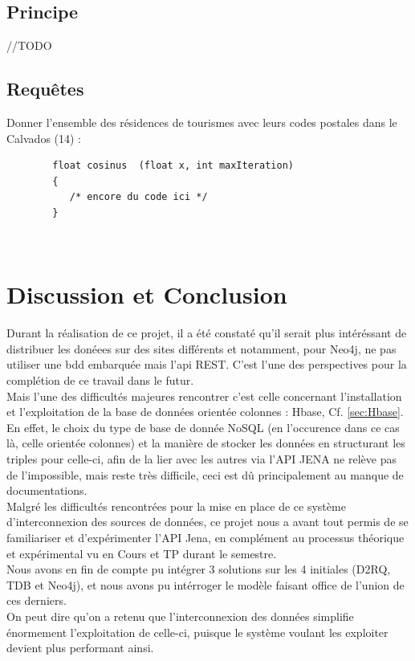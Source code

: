 \documentclass{article}
\newenvironment{DDbox}[1]{
\begin{lrbox}{\BBbox}\begin{minipage}{\linewidth}}
{\end{minipage}\end{lrbox}\noindent\colorbox{Zgris}{\usebox{\BBbox}} \\
[.5cm]}
\begin{document}
\subsection{Principe}
//TODO

\subsection{Requêtes}

Donner l'ensemble des résidences de tourismes avec leurs codes postales dans le Calvados (14) : \\

\begin{DDbox}{\linewidth}
\begin{Verbatim}
        float cosinus  (float x, int maxIteration)
        {
           /* encore du code ici */
        }
\end{Verbatim}
\end{DDbox}


\section{Discussion et Conclusion }
Durant la réalisation de ce projet, il a été constaté qu'il serait plus intéréssant de distribuer les donéees sur des sites différents et notamment, pour Neo4j, ne pas utiliser une bdd embarquée mais l'api REST. C'est l'une des perspectives pour la complétion de ce travail dans le futur.\\

Mais l'une des difficultés majeures rencontrer c'est celle concernant l'installation et l'exploitation de la base de données orientée colonnes : Hbase, Cf. \ref{sec:Hbase}.\\
En effet, le choix du type de base de donnée NoSQL (en l'occurence dans ce cas là, celle orientée colonnes) et la manière de stocker les données en structurant les triples pour celle-ci,  afin de la lier avec les autres via l'API JENA ne relève pas de l'impossible, mais reste très difficile, ceci est dû principalement au manque de documentations.\\
Malgré les difficultés rencontrées pour la mise en place de ce système d'interconnexion des sources de données, ce projet nous a avant tout permis de se familiariser et d'expérimenter l'API Jena, en complément au processus théorique et expérimental vu en Cours et TP durant le semestre.\\
Nous avons en fin de compte pu intégrer 3 solutions sur les 4 initiales (D2RQ, TDB et Neo4j), et nous avons pu intérroger le modèle faisant office de l'union de ces derniers.\\
On peut dire qu'on a retenu que l'interconnexion des données simplifie énormement l'exploitation de celle-ci, puisque le système voulant les exploiter devient plus performant ainsi.
\end{document}
